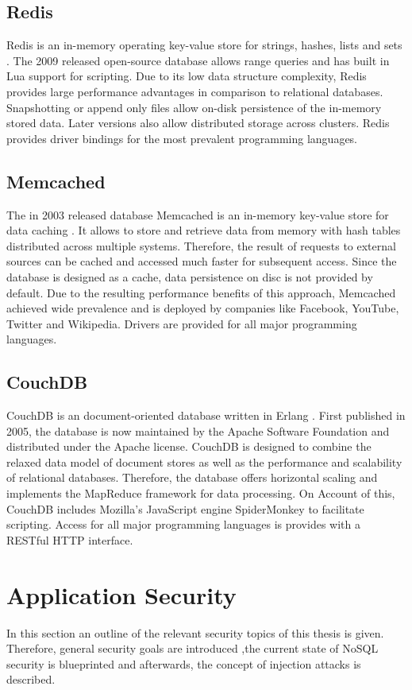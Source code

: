 \subsection{Redis}
Redis is an in-memory operating key-value store for strings, hashes, lists and sets \cite{Sanfilippo:2016}. The 2009 released open-source database allows range queries and has built in Lua support for scripting. Due to its low data structure complexity, Redis provides large performance advantages in comparison to relational databases. Snapshotting or append only files allow on-disk persistence of the in-memory stored data. Later versions also allow distributed storage across clusters. Redis provides driver bindings for the most prevalent programming languages.

\subsection{Memcached}
The in 2003 released database Memcached is an in-memory key-value store for data caching \cite{Dormando:2015}. It allows to store and retrieve data from memory with hash tables distributed across multiple systems. Therefore, the result of requests to external sources can be cached and accessed much faster for subsequent access. Since the database is designed as a cache, data persistence on disc is not provided by default. Due to the resulting performance benefits of this approach, Memcached achieved wide prevalence and is deployed by companies like Facebook, YouTube, Twitter and Wikipedia. Drivers are provided for all major programming languages.


\subsection{CouchDB}
CouchDB is an document-oriented database written in Erlang \cite{Anderson:2010}. First published in 2005, the database is now maintained by the Apache Software Foundation and distributed under the Apache license. CouchDB is designed to combine the relaxed data model of document stores as well as the performance and scalability of relational databases. Therefore, the database offers horizontal scaling and implements the MapReduce framework for data processing. On Account of this, CouchDB includes Mozilla's JavaScript engine SpiderMonkey to facilitate scripting. Access for all major programming languages is provides with a RESTful HTTP interface. 

\section{Application Security}
In this section an outline of the relevant security topics of this thesis is given. Therefore, general security goals are introduced ,the current state of NoSQL security is blueprinted and afterwards, the concept of injection attacks is described.

